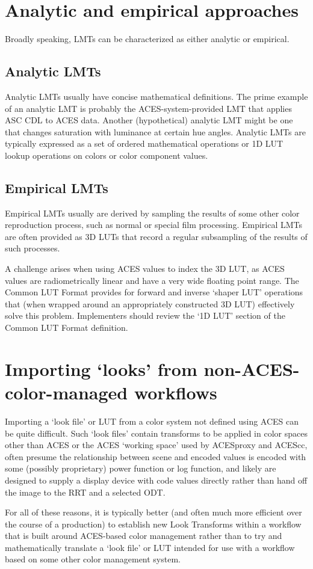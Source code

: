 \section{Analytic and empirical approaches}
Broadly speaking, LMTs can be characterized as either analytic or empirical. 

\subsection{Analytic LMTs}
Analytic LMTs usually have concise mathematical definitions. The prime example of an analytic LMT is probably the ACES-system-provided LMT that applies ASC CDL to ACES data. Another (hypothetical) analytic LMT might be one that changes saturation with luminance at certain hue angles. Analytic LMTs are typically expressed as a set of ordered mathematical operations or 1D LUT lookup operations on colors or color component values.

\subsection{Empirical LMTs}
Empirical LMTs usually are derived by sampling the results of some other color reproduction process, such as normal or special film processing. Empirical LMTs are often provided as 3D LUTs that record a regular subsampling of the results of such processes. 

A challenge arises when using ACES values to index the 3D LUT, as ACES values are radiometrically linear and have a very wide floating point range. The Common LUT Format provides for forward and inverse `shaper LUT' operations that (when wrapped around an appropriately constructed 3D LUT) effectively solve this problem. Implementers should review the `1D LUT' section of the Common LUT Format definition.

\section{Importing `looks' from non-ACES-color-managed workflows}
Importing a `look file' or LUT from a color system not defined using ACES can be quite difficult. Such ‘look files’ contain transforms to be applied in color spaces other than ACES or the ACES ‘working space’ used by ACESproxy and ACEScc, often presume the relationship between scene and encoded values is encoded with some (possibly proprietary) power function or log function, and likely are designed to supply a display device with code values directly rather than hand off the image to the RRT and a selected ODT.

For all of these reasons, it is typically better (and often much more efficient over the course of a production) to establish new Look Transforms within a workflow that is built around ACES-based color management rather than to try and mathematically translate a `look file' or LUT intended for use with a workflow based on some other color management system.